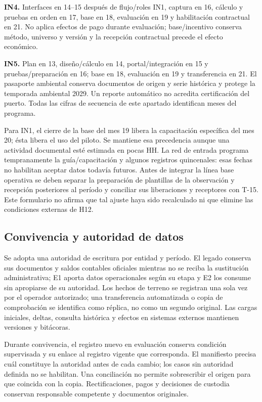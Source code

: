 \textbf{IN4.} Interfaces en 14--15 después de flujo/roles IN1, captura en 16, cálculo y pruebas en orden en 17, base en 18, evaluación en 19 y habilitación contractual en 21. No aplica efectos de pago durante evaluación; base/incentivo conserva método, universo y versión y la recepción contractual precede el efecto económico.

\textbf{IN5.} Plan en 13, diseño/cálculo en 14, portal/integración en 15 y pruebas/preparación en 16; base en 18, evaluación en 19 y transferencia en 21. El pasaporte ambiental conserva documentos de origen y serie histórica y protege la temporada ambiental 2029. Un reporte automático no acredita certificación del puerto. Todas las cifras de secuencia de este apartado identifican meses del programa.

Para IN1, el cierre de la base del mes 19 libera la capacitación específica del mes 20; ésta libera el uso del piloto. Se mantiene esa precedencia aunque una actividad documental esté estimada en pocas HH. La red de entrada programa tempranamente la guía/capacitación y algunos registros quincenales: esas fechas no habilitan aceptar datos todavía futuros. Antes de integrar la línea base operativa se deben separar la preparación de plantillas de la observación y recepción posteriores al período y conciliar sus liberaciones y receptores con T-15. Este formulario no afirma que tal ajuste haya sido recalculado ni que elimine las condiciones externas de H12.

\subsection{Convivencia y autoridad de datos}
Se adopta una autoridad de escritura por entidad y período. El legado conserva sus documentos y saldos contables oficiales mientras no se reciba la sustitución administrativa; E1 aporta datos operacionales según su etapa y E2 los consume sin apropiarse de su autoridad. Los hechos de terreno se registran una sola vez por el operador autorizado; una transferencia automatizada o copia de comprobación se identifica como réplica, no como un segundo original. Las cargas iniciales, deltas, consulta histórica y efectos en sistemas externos mantienen versiones y bitácoras.

Durante convivencia, el registro nuevo en evaluación conserva condición supervisada y su enlace al registro vigente que corresponda. El manifiesto precisa cuál constituye la autoridad antes de cada cambio; los casos sin autoridad definida no se habilitan. Una conciliación no permite sobrescribir el origen para que coincida con la copia. Rectificaciones, pagos y decisiones de custodia conservan responsable competente y documentos originales.

